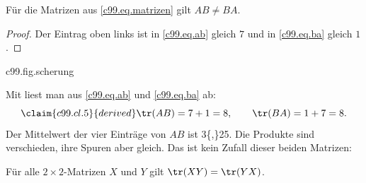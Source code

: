 \begin{proposition}\label{c99.prop.reihenfolge}
  Für die Matrizen aus \eqref{c99.eq.matrizen} gilt $AB \neq BA$.
\end{proposition}
\begin{proof}
  Der Eintrag oben links ist in \eqref{c99.eq.ab} gleich $7$ und in
  \eqref{c99.eq.ba} gleich $1$.
\end{proof}

\begin{tpcfigure}{c99.fig.scherung}
  \caption{Die Matrix $A$ als Abbildung der Ebene: Der Punkt $(x,y)$ geht auf
    $(x+2y,\,y)$. Das gestrichelte Einheitsquadrat wird dabei zum schraffierten
    Parallelogramm mit den Ecken $(0,0)$, $(1,0)$, $(3,1)$ und $(2,1)$; die
    Grundseite bleibt liegen, die Deckseite wandert um zwei Einheiten nach rechts.
    Diese Bildunterschrift ist absichtlich lang, damit der Zeilenumbruch langer
    deutscher Zusammensetzungen wie Parallelogrammflächeninhaltsberechnung und
    Einheitsquadratverschiebungsabbildung in Druck und Netzfassung geprüft wird.}
\end{tpcfigure}


Mit  liest man aus \eqref{c99.eq.ab} und \eqref{c99.eq.ba} ab:
\begin{equation}\label{c99.eq.spuren}\claim{c99.cl.5}{derived}
  \tr(AB) = 7 + 1 = 8,
  \qquad
  \tr(BA) = 1 + 7 = 8.
\end{equation}
Der Mittelwert der vier Einträge von $AB$ ist \num[c99.cl.19]{3{,}25}{}.
Die Produkte sind verschieden, ihre Spuren aber gleich. Das ist kein Zufall dieser
beiden Matrizen:

\begin{theorem}\label{c99.thm.spur}
  Für alle $2\times 2$-Matrizen $X$ und $Y$ gilt $\tr(XY) = \tr(YX)$.
\end{theorem}

